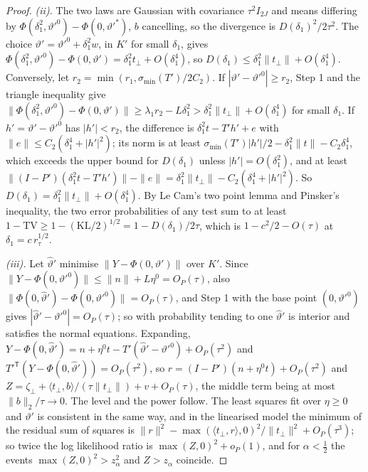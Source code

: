 \begin{proof}
\emph{(ii).} The two laws are Gaussian with covariance $\tau^2I_{2J}$ and means differing by $\Phi(\delta_1^2,\vartheta'^0)-\Phi(0,\vartheta'^*)$, $b$ cancelling, so the divergence is $D(\delta_1)^2/2\tau^2$. The choice $\vartheta'=\vartheta'^0+\delta_1^2w$, in $K'$ for small $\delta_1$, gives $\Phi(\delta_1^2,\vartheta'^0)-\Phi(0,\vartheta')=\delta_1^2t_\perp+O(\delta_1^4)$, so $D(\delta_1)\le\delta_1^2\|t_\perp\|+O(\delta_1^4)$. Conversely, let $r_2=\min(r_1,\sigma_{\min}(T')/2C_2)$. If $|\vartheta'-\vartheta'^0|\ge r_2$, Step 1 and the triangle inequality give $\|\Phi(\delta_1^2,\vartheta'^0)-\Phi(0,\vartheta')\|\ge\lambda_1r_2-L\delta_1^2>\delta_1^2\|t_\perp\|+O(\delta_1^4)$ for small $\delta_1$. If $h'=\vartheta'-\vartheta'^0$ has $|h'|<r_2$, the difference is $\delta_1^2t-T'h'+e$ with $\|e\|\le C_2(\delta_1^4+|h'|^2)$; its norm is at least $\sigma_{\min}(T')|h'|/2-\delta_1^2\|t\|-C_2\delta_1^4$, which exceeds the upper bound for $D(\delta_1)$ unless $|h'|=O(\delta_1^2)$, and at least $\|(I-P')(\delta_1^2t-T'h')\|-\|e\|=\delta_1^2\|t_\perp\|-C_2(\delta_1^4+|h'|^2)$. So $D(\delta_1)=\delta_1^2\|t_\perp\|+O(\delta_1^4)$. By Le Cam's two point lemma and Pinsker's inequality, the two error probabilities of any test sum to at least $1-\mathrm{TV}\ge1-(\mathrm{KL}/2)^{1/2}=1-D(\delta_1)/2\tau$, which is $1-c^2/2-O(\tau)$ at $\delta_1=c\,r_\tau^{1/2}$.

\emph{(iii).} Let $\hat\vartheta'$ minimise $\|Y-\Phi(0,\vartheta')\|$ over $K'$. Since $\|Y-\Phi(0,\vartheta'^0)\|\le\|n\|+L\eta^0=O_P(\tau)$, also $\|\Phi(0,\hat\vartheta')-\Phi(0,\vartheta'^0)\|=O_P(\tau)$, and Step 1 with the base point $(0,\vartheta'^0)$ gives $|\hat\vartheta'-\vartheta'^0|=O_P(\tau)$; so with probability tending to one $\hat\vartheta'$ is interior and satisfies the normal equations. Expanding, $Y-\Phi(0,\hat\vartheta')=n+\eta^0t-T'(\hat\vartheta'-\vartheta'^0)+O_P(\tau^2)$ and $T'^{\mathsf T}(Y-\Phi(0,\hat\vartheta'))=O_P(\tau^2)$, so $r=(I-P')(n+\eta^0t)+O_P(\tau^2)$ and $Z=\zeta_\perp+\langle t_\perp,b\rangle/(\tau\|t_\perp\|)+v+O_P(\tau)$, the middle term being at most $\|b\|_2/\tau\to0$. The level and the power follow. The least squares fit over $\eta\ge0$ and $\vartheta'$ is consistent in the same way, and in the linearised model the minimum of the residual sum of squares is $\|r\|^2-\max(\langle t_\perp,r\rangle,0)^2/\|t_\perp\|^2+O_P(\tau^3)$; so twice the log likelihood ratio is $\max(Z,0)^2+o_P(1)$, and for $\alpha<\tfrac12$ the events $\max(Z,0)^2>z_\alpha^2$ and $Z>z_\alpha$ coincide.
\end{proof}

